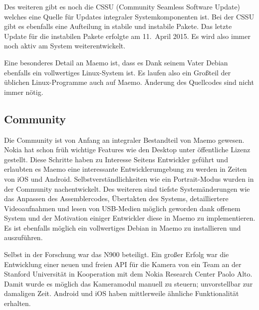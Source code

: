 Des weiteren gibt es noch die CSSU\thinspace\cite{online:maemo-cssu} (Community Seamless Software Update) welches eine Quelle für Updates integraler Systemkomponenten ist. Bei der CSSU gibt es ebenfalls eine Aufteilung in stabile und instabile Pakete. Das letzte Update für die instabilen Pakete erfolgte am 11.\ April 2015\thinspace\cite{online:maemo-cssuchangelog}. Es wird also immer noch aktiv am System weiterentwickelt.

Eine besonderes Detail an Maemo ist, dass es Dank seinem Vater Debian ebenfalls ein vollwertiges Linux-System ist. Es laufen also ein Großteil der üblichen Linux-Programme auch auf Maemo. Änderung des Quellcodes sind nicht immer nötig.
\newline

\subsection{Community}
Die Community ist von Anfang an integraler Bestandteil von Maemo gewesen. Nokia hat schon früh wichtige Features wie den Desktop unter öffentliche Lizenz gestellt\thinspace\cite{online:maemo-hildon}. Diese Schritte haben zu Interesse Seitens Entwickler geführt und erlaubten es Maemo eine interessante Entwicklerumgebung zu werden in Zeiten von iOS und Android. Selbstverständlichkeiten wie ein Portrait-Modus wurden in der Community nachentwickelt\thinspace\cite{online:maemo-portrait}. Des weiteren sind  tiefste Systemänderungen wie das Anpassen des Assemblercodes\thinspace\cite{online:maemo-thumb}, Übertakten des Systems\thinspace\cite{online:maemo-overclocking}, detailliertere Videoaufnahmen\thinspace\cite{online:maemo-hdvideo} und lesen von USB-Medien\thinspace\cite{online:maemo-usbhost}  möglich geworden dank offenem System und der Motivation einiger Entwickler diese in Maemo zu implementieren. Es ist ebenfalls möglich ein vollwertiges Debian in Maemo zu installieren und auszuführen\thinspace\cite{online:maemo-easydebian}\thinspace\cite{online:maemo-easydebianwiki}.

Selbst in der Forschung war das N900 beteiligt. Ein großer Erfolg war die Entwicklung einer neuen und freien API für die Kamera von ein Team an der Stanford Universität in Kooperation mit dem Nokia Research Center Paolo Alto\thinspace\cite{online:maemo-fcam}. Damit wurde es möglich das Kameramodul manuell zu steuern; unvorstellbar zur damaligen Zeit. Android und iOS haben mittlerweile ähnliche Funktionalität erhalten\thinspace\cite{online:maemo-fcamlegacy}.

